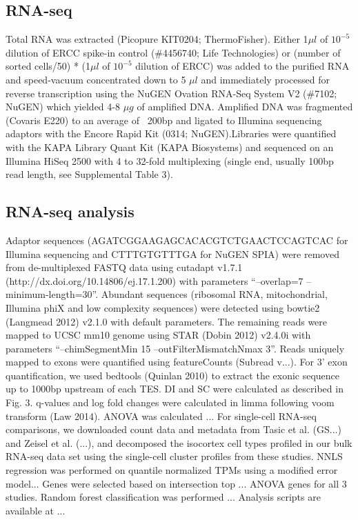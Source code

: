 \subsection{RNA-seq}
Total RNA was extracted (Picopure KIT0204; ThermoFisher). Either 1$\mu l$ of $10^{-5}$ dilution of ERCC spike-in control (\#4456740; Life Technologies) or (number of sorted cells/50) * (1$\mu l$ of $10^{-5}$ dilution of ERCC) was added to the purified RNA and speed-vacuum concentrated down to 5 $\mu l$ and immediately processed for reverse transcription using the NuGEN Ovation RNA-Seq System V2 (\#7102; NuGEN) which yielded 4-8 $\mu g$ of amplified DNA. Amplified DNA was fragmented (Covaris E220) to an average of ~200bp and ligated to Illumina sequencing adaptors with the Encore Rapid Kit (0314; NuGEN).Libraries were quantified with the KAPA Library Quant Kit (KAPA Biosystems) and sequenced on an Illumina HiSeq 2500 with 4 to 32-fold multiplexing (single end, usually 100bp read length, see Supplemental Table 3).

\subsection{RNA-seq analysis}
Adaptor sequences (AGATCGGAAGAGCACACGTCTGAACTCCAGTCAC for Illumina sequencing and CTTTGTGTTTGA for NuGEN SPIA) were removed from de-multiplexed FASTQ data using cutadapt v1.7.1 (http://dx.doi.org/10.14806/ej.17.1.200) with parameters “--overlap=7 --minimum-length=30”. Abundant sequences (ribosomal RNA, mitochondrial, Illumina phiX and low complexity sequences) were detected using bowtie2 (Langmead 2012) v2.1.0 with default parameters. The remaining reads were mapped to UCSC mm10 genome using STAR (Dobin 2012) v2.4.0i with parameters “--chimSegmentMin 15 --outFilterMismatchNmax 3”. 
Reads uniquely mapped to exons were quantified using featureCounts (Subread v...).
For 3' exon quantification, we used bedtools (Quinlan 2010) to extract the exonic sequence up to 1000bp upstream of each TES.
DI and SC were calculated as described in Fig. 3. q-values and log fold changes were calculated in limma following voom transform (Law 2014).
ANOVA was calculated ...
For single-cell RNA-seq comparisons, we downloaded count data and metadata from Tasic et al. (GS...) and Zeisel et al. (...), and decomposed the isocortex cell types profiled in our bulk RNA-seq data set using the single-cell cluster profiles from these studies.
NNLS regression was performed on quantile normalized TPMs using a modified error model... Genes were selected based on intersection top ... ANOVA genes for all 3 studies.
Random forest classification was performed ...
Analysis scripts are available at ...

